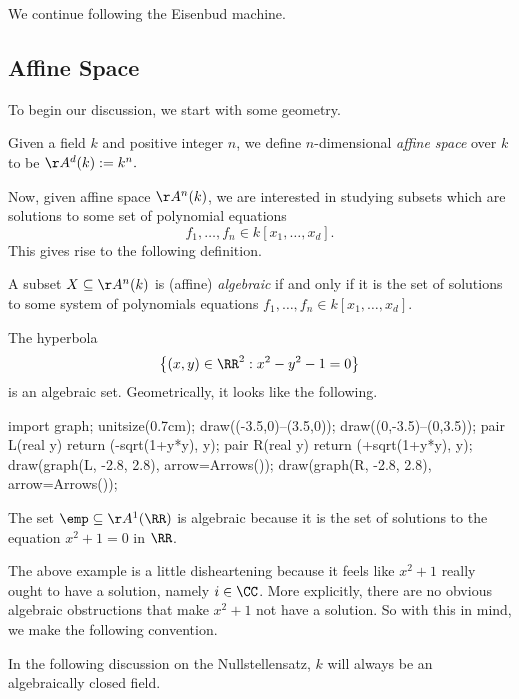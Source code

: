 \documentclass[../notes.tex]{subfiles}
\begin{document}

We continue following the Eisenbud machine.

\subsection{Affine Space}
To begin our discussion, we start with some geometry.
\begin{definition}
	Given a field $k$ and positive integer $n$, we define $n$-dimensional \textit{affine space} over $k$ to be $\AA^d(k):=k^n.$
\end{definition}
Now, given affine space $\AA^n(k)$, we are interested in studying subsets which are solutions to some set of polynomial equations
\[f_1,\ldots,f_n\in k[x_1,\ldots,x_d].\]
This gives rise to the following definition.
\begin{definition}[Algebraic]
	A subset $X\subseteq\AA^n(k)$ is (affine) \textit{algebraic} if and only if it is the set of solutions to some system of polynomials equations $f_1,\ldots,f_n\in k[x_1,\ldots,x_d]$.
\end{definition}
\begin{example}
	The hyperbola
	\[\left\{(x,y)\in\RR^2:x^2-y^2-1=0\right\}\]
	is an algebraic set. Geometrically, it looks like the following.
	\begin{center}
		\begin{asy}
			import graph;
			unitsize(0.7cm);
			draw((-3.5,0)--(3.5,0)); draw((0,-3.5)--(0,3.5));
			pair L(real y)
			{
				return (-sqrt(1+y*y), y);
			}
			pair R(real y)
			{
				return (+sqrt(1+y*y), y);
			}
			draw(graph(L, -2.8, 2.8), arrow=Arrows());
			draw(graph(R, -2.8, 2.8), arrow=Arrows());
		\end{asy}
	\end{center}
\end{example}
\begin{example} \label{ex:notalgclosed}
	The set $\emp\subseteq\AA^1(\RR)$ is algebraic because it is the set of solutions to the equation $x^2+1=0$ in $\RR$.
\end{example}
The above example is a little disheartening because it feels like $x^2+1$ really ought to have a solution, namely $i\in\CC$. More explicitly, there are no obvious algebraic obstructions that make $x^2+1$ not have a solution. So with this in mind, we make the following convention.
\begin{convention}
	In the following discussion on the Nullstellensatz, $k$ will always be an algebraically closed field.
\end{convention}
\end{document}
